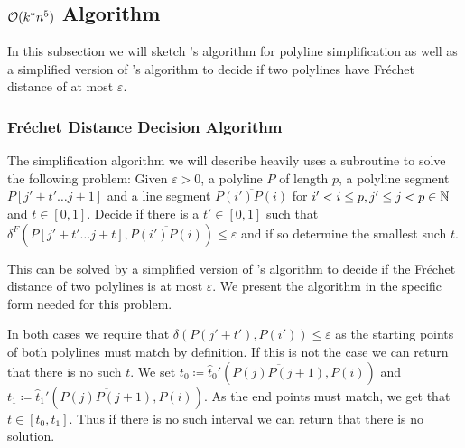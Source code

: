 \subsection{\(\mathcal{O}(k^*n^5)\) Algorithm}
\label{subsec:simple_algo}

In this subsection we will sketch \citeauthor{on_optimal_polyline_simplification_using_the_hausdorff_and_frechet_distance}'s algorithm for polyline simplification as well as a simplified version of \citeauthor{computing_the_frechet_distance_between_two_polygonal_curves}'s algorithm to decide if two polylines have Fréchet distance of at most \(\varepsilon\). 

\subsubsection{Fréchet Distance Decision Algorithm}
\label{ssec:alt_godau}
The simplification algorithm we will describe heavily uses a subroutine to solve the following problem: Given \(\varepsilon > 0\), a polyline \(P \) of length \(p\), a polyline segment \(P[j' + t' \dots j+1]\) and a line segment \(\overline{P(i')P(i)}\) for \(i' < i \leq p, j' \leq j < p\in \mathbb{N}\) and \(t \in [0, 1]\). Decide if there is a \(t' \in [0, 1]\) such that \(\delta^F(P[j' + t' \dots j + t], \overline{P(i')P(i)}) \leq \varepsilon\) and if so determine the smallest such \(t\).  

This can be solved by a simplified version of \citeauthor{computing_the_frechet_distance_between_two_polygonal_curves}'s algorithm to decide if the Fréchet distance of two polylines is at most \(\varepsilon\). We present the algorithm in the specific form needed for this problem. 

In both cases we require that \(\delta(P(j' + t'), P(i')) \leq \varepsilon\) as the starting points of both polylines must match by definition. If this is not the case we can return that there is no such \(t\). We set \(t_0 \coloneq \hat t_0'(\overline{P(j)P(j+1)}, P(i))\) and \(t_1 \coloneq \hat t_1'(\overline{P(j)P(j+1)}, P(i))\). As the end points must match, we get that \(t \in [t_0, t_1]\). Thus if there is no such interval we can return that there is no solution.

